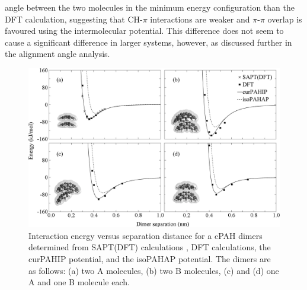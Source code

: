 angle between the two molecules in the minimum energy configuration than the DFT calculation, suggesting that CH-$\pi$ interactions are weaker and $\pi$-$\pi$ overlap is favoured using the intermolecular potential.  This difference does not seem to cause a significant difference in larger systems, however, as discussed further in the alignment angle analysis. %
%
\begin{figure}[!tbh]
\centering
\includegraphics[width=1\linewidth]{Figures/potentialDFT_curves.eps}
\caption{Interaction energy versus separation distance for a cPAH dimers determined from SAPT(DFT) calculations \cite{Cabaleiro-Lago2018}, DFT calculations, the curPAHIP potential, and the isoPAHAP potential. The dimers are as follows: (a) two A molecules, (b) two B molecules, (c) and (d) one A and one B molecule each.}
\label{fig:potentialDFTcurves}
\end{figure}
%
%
